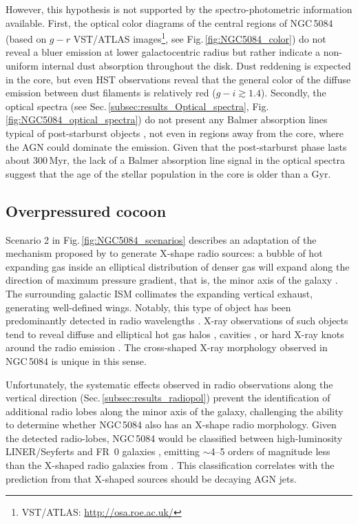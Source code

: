 \documentclass[modern]{aastex631}
\begin{document}
However, this hypothesis is not supported by the spectro-photometric information available. First, the optical color diagrams of the central regions of NGC\,5084 (based on $g-r$ VST/ATLAS images\footnote{VST/ATLAS: \url{http://osa.roe.ac.uk/}}, see Fig.\,\ref{fig:NGC5084_color}) do not reveal a bluer emission at lower galactocentric radius but rather indicate a non-uniform internal dust absorption throughout the disk. Dust reddening is expected in the core, but even HST observations reveal that the general color of the diffuse emission between dust filaments is relatively red ($g-i\gtrsim1.4$).
Secondly, the optical spectra (see Sec.\,\ref{subsec:results_Optical_spectra}, Fig.\,\ref{fig:NGC5084_optical_spectra}) do not present any Balmer absorption lines typical of post-starburst objects \citep[also called E+A or K+A galaxies,][]{dressler+1983apj270_7}, not even in regions away from the core, where the AGN could dominate the emission. Given that the post-starburst phase lasts about 300\,Myr, the lack of a Balmer absorption line signal in the optical spectra suggest that the age of the stellar population in the core is older than a Gyr. 


\subsection{Overpressured cocoon}
\label{subsec:discussion_cocoon}

Scenario 2 in Fig.\,\ref{fig:NGC5084_scenarios} describes an adaptation of the mechanism proposed by \citet{capetti+2002aap394_39} to generate X-shape radio sources: a bubble of hot expanding gas inside an elliptical distribution of denser gas will expand along the direction of maximum pressure gradient, that is, the minor axis of the galaxy  \citep{blandford+1974mnras169_395}. The surrounding galactic ISM collimates the expanding vertical exhaust, generating well-defined wings. Notably, this type of object has been predominantly detected in radio wavelengths \citep[X-shaped radio galaxies,][]{hodgeskluck2011thesis, giri+2024sci11_1371101}.  X-ray observations of such objects tend to reveal diffuse and elliptical hot gas halos \citep{hodgeskluck+2010apj710_1205}, cavities \citep{hodgeskluck+2010apj717_37}, or hard X-ray knots around the radio emission \citep{hodgeskluck+2012apj746_167}. The cross-shaped X-ray morphology observed in NGC\,5084 is unique in this sense. 

Unfortunately, the systematic effects observed in radio observations along the vertical direction (Sec.\,\ref{subsec:results_radiopol}) prevent the identification of additional radio lobes along the minor axis of the galaxy, challenging the ability to determine whether NGC\,5084 also has an X-shape radio morphology. Given the detected radio-lobes, NGC\,5084 would be classified between high-luminosity LINER/Seyferts and FR~0 galaxies \citep[see Table \ref{tab:Radio_Lobes},][]{baldi2023aap31_3}, emitting $\sim$4--5 orders of magnitude less than the X-shaped radio galaxies from \citet{cheung+2009apj181_548}. This classification correlates with the prediction from \citet{hodgeskluck2011thesis} that X-shaped sources should be decaying AGN jets. 
\end{document}
